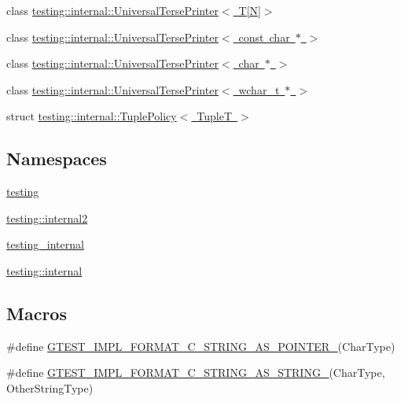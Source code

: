 \begin{DoxyCompactItemize}
\item 
class \mbox{\hyperlink{classtesting_1_1internal_1_1UniversalTersePrinter_3_01T[N]_4}{testing\+::internal\+::\+Universal\+Terse\+Printer$<$ T\mbox{[}\+N\mbox{]}$>$}}
\item 
class \mbox{\hyperlink{classtesting_1_1internal_1_1UniversalTersePrinter_3_01const_01char_01_5_01_4}{testing\+::internal\+::\+Universal\+Terse\+Printer$<$ const char $\ast$ $>$}}
\item 
class \mbox{\hyperlink{classtesting_1_1internal_1_1UniversalTersePrinter_3_01char_01_5_01_4}{testing\+::internal\+::\+Universal\+Terse\+Printer$<$ char $\ast$ $>$}}
\item 
class \mbox{\hyperlink{classtesting_1_1internal_1_1UniversalTersePrinter_3_01wchar__t_01_5_01_4}{testing\+::internal\+::\+Universal\+Terse\+Printer$<$ wchar\+\_\+t $\ast$ $>$}}
\item 
struct \mbox{\hyperlink{structtesting_1_1internal_1_1TuplePolicy}{testing\+::internal\+::\+Tuple\+Policy$<$ Tuple\+T $>$}}
\end{DoxyCompactItemize}
\subsection*{Namespaces}
\begin{DoxyCompactItemize}
\item 
 \mbox{\hyperlink{namespacetesting}{testing}}
\item 
 \mbox{\hyperlink{namespacetesting_1_1internal2}{testing\+::internal2}}
\item 
 \mbox{\hyperlink{namespacetesting__internal}{testing\+\_\+internal}}
\item 
 \mbox{\hyperlink{namespacetesting_1_1internal}{testing\+::internal}}
\end{DoxyCompactItemize}
\subsection*{Macros}
\begin{DoxyCompactItemize}
\item 
\#define \mbox{\hyperlink{gtest-printers_8h_a79d4724b4bc2a1dd8493c366b5ca626a}{G\+T\+E\+S\+T\+\_\+\+I\+M\+P\+L\+\_\+\+F\+O\+R\+M\+A\+T\+\_\+\+C\+\_\+\+S\+T\+R\+I\+N\+G\+\_\+\+A\+S\+\_\+\+P\+O\+I\+N\+T\+E\+R\+\_\+}}(Char\+Type)
\item 
\#define \mbox{\hyperlink{gtest-printers_8h_ad6102ed2a0571d5196e606a061c16a10}{G\+T\+E\+S\+T\+\_\+\+I\+M\+P\+L\+\_\+\+F\+O\+R\+M\+A\+T\+\_\+\+C\+\_\+\+S\+T\+R\+I\+N\+G\+\_\+\+A\+S\+\_\+\+S\+T\+R\+I\+N\+G\+\_\+}}(Char\+Type,  Other\+String\+Type)
\end{DoxyCompactItemize}
